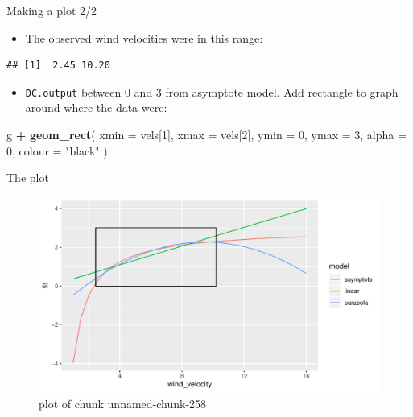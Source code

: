 \documentclass[ignorenonframetext,]{beamer}
\newenvironment{Shaded}{\begin{snugshade}}{\end{snugshade}}
\newcommand{\DataTypeTok}[1]{\textcolor[rgb]{0.13,0.29,0.53}{#1}}
\newcommand{\DecValTok}[1]{\textcolor[rgb]{0.00,0.00,0.81}{#1}}
\newcommand{\KeywordTok}[1]{\textcolor[rgb]{0.13,0.29,0.53}{\textbf{#1}}}
\newcommand{\NormalTok}[1]{#1}
\newcommand{\OperatorTok}[1]{\textcolor[rgb]{0.81,0.36,0.00}{\textbf{#1}}}
\newcommand{\StringTok}[1]{\textcolor[rgb]{0.31,0.60,0.02}{#1}}
\providecommand{\tightlist}{%
  \setlength{\itemsep}{0pt}\setlength{\parskip}{0pt}}
\begin{document}
\begin{frame}[fragile]{Making a plot 2/2}
\protect\hypertarget{making-a-plot-22}{}

\begin{itemize}
\tightlist
\item
  The observed wind velocities were in this range:
\end{itemize}

\begin{Shaded}
\end{Shaded}

\begin{verbatim}
## [1]  2.45 10.20
\end{verbatim}

\begin{itemize}
\tightlist
\item
  \texttt{DC.output} between 0 and 3 from asymptote model. Add rectangle
  to graph around where the data were:
\end{itemize}

\begin{Shaded}
\begin{Highlighting}[]
\NormalTok{g }\OperatorTok{+}\StringTok{ }\KeywordTok{geom_rect}\NormalTok{(}
  \DataTypeTok{xmin =}\NormalTok{ vels[}\DecValTok{1}\NormalTok{], }\DataTypeTok{xmax =}\NormalTok{ vels[}\DecValTok{2}\NormalTok{], }\DataTypeTok{ymin =} \DecValTok{0}\NormalTok{, }\DataTypeTok{ymax =} \DecValTok{3}\NormalTok{,}
  \DataTypeTok{alpha =} \DecValTok{0}\NormalTok{, }\DataTypeTok{colour =} \StringTok{"black"}
\NormalTok{)}
\end{Highlighting}
\end{Shaded}

\end{frame}

\begin{frame}{The plot}
\protect\hypertarget{the-plot-1}{}

\begin{figure}
\centering
\includegraphics{figure/unnamed-chunk-258-1.pdf}
\caption{plot of chunk unnamed-chunk-258}
\end{figure}

\end{frame}
\end{document}
